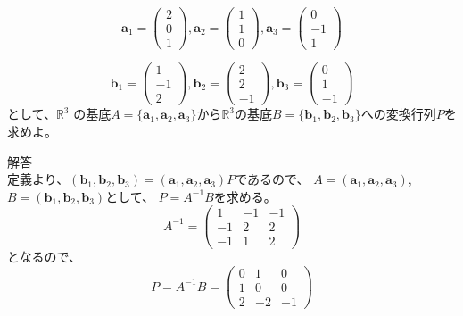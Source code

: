 \documentclass{jlreq}
\begin{document}
\begin{problem}
  \begin{equation*}
    \boldsymbol{a}_1 = \begin{pmatrix}
      2 \\ 0 \\ 1
    \end{pmatrix}, \boldsymbol{a}_2 = \begin{pmatrix}
      1 \\ 1 \\ 0
    \end{pmatrix}, \boldsymbol{a}_3 = \begin{pmatrix}
      0 \\ -1 \\ 1
    \end{pmatrix}
  \end{equation*}
  
  \begin{equation*}
    \boldsymbol{b}_1 = \begin{pmatrix}
      1 \\ -1 \\ 2
    \end{pmatrix}, \boldsymbol{b}_2 = \begin{pmatrix}
      2 \\ 2 \\ -1
    \end{pmatrix}, \boldsymbol{b}_3 = \begin{pmatrix}
      0 \\ 1 \\ -1
    \end{pmatrix}
  \end{equation*}
  として、$\mathbb{R}^3$ 
  の基底$A = \{ \boldsymbol{a}_1, \boldsymbol{a}_2, \boldsymbol{a}_3 \}$から$\mathbb{R}^3$の基底$B = \{ \boldsymbol{b}_1, \boldsymbol{b}_2, \boldsymbol{b}_3 \}$への変換行列$P$を求めよ。

  \dotfill

  解答 \\
  定義より、$(\boldsymbol{b}_1, \boldsymbol{b}_2, \boldsymbol{b}_3) = ( \boldsymbol{a}_1, \boldsymbol{a}_2, \boldsymbol{a}_3) P$であるので、
  $A = (\boldsymbol{a}_1, \boldsymbol{a}_2, \boldsymbol{a}_3)$, $B = (\boldsymbol{b}_1, \boldsymbol{b}_2, \boldsymbol{b}_3)$として、
  $P = A^{-1} B$を求める。
  \begin{equation*}
    A^{-1} = \begin{pmatrix}
      1 & -1 & -1 \\
      -1 & 2 & 2 \\
      -1 & 1 & 2
    \end{pmatrix}
  \end{equation*}
  となるので、
  \begin{equation*}
    P = A^{-1} B = \begin{pmatrix}
      0 & 1 & 0 \\
      1 & 0 & 0 \\
      2 & -2 & -1
    \end{pmatrix}
  \end{equation*}


\end{problem}
\end{document}

